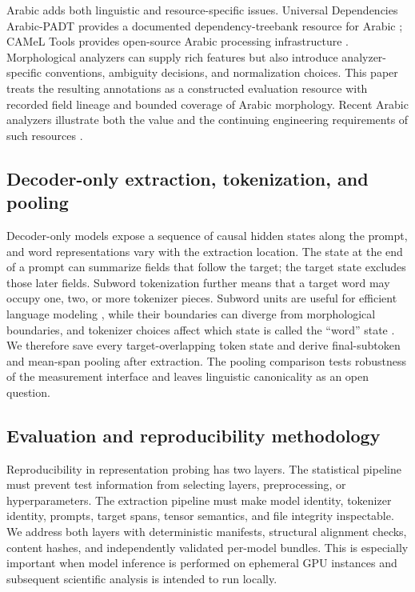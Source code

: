 \documentclass[pdflatex,sn-basic]{sn-jnl}
\begin{document}
Arabic adds both linguistic and resource-specific issues. Universal
Dependencies Arabic-PADT provides a documented dependency-treebank resource
for Arabic \citep{taji-etal-2017}; CAMeL Tools provides open-source Arabic
processing infrastructure \citep{obeid-etal-2020}. Morphological analyzers
can supply rich features but also introduce analyzer-specific conventions,
ambiguity decisions, and normalization choices. This paper treats the
resulting annotations as a constructed evaluation resource with recorded field
lineage and bounded coverage of Arabic morphology. Recent Arabic analyzers
illustrate both the value and the
continuing engineering requirements of such resources
\citep{khairallah-etal-2024}.

\subsection{Decoder-only extraction, tokenization, and pooling}

Decoder-only models expose a sequence of causal hidden states along the
prompt, and word representations vary with the extraction location. The state at
the end of a prompt can summarize fields that follow the target; the target
state excludes those later fields. Subword tokenization further means that a target word may occupy one,
two, or more tokenizer pieces. Subword units are useful for efficient language
modeling \citep{sennrich-etal-2016}, while their boundaries can diverge from
morphological boundaries, and tokenizer choices affect which state is called
the ``word'' state \citep{bostrom-durrett-2020}. We therefore save every
target-overlapping token state and derive final-subtoken and mean-span pooling
after extraction. The pooling comparison tests robustness of the measurement
interface and leaves linguistic canonicality as an open question.

\subsection{Evaluation and reproducibility methodology}

Reproducibility in representation probing has two layers. The statistical
pipeline must prevent test information from selecting layers, preprocessing,
or hyperparameters. The extraction pipeline must make model identity,
tokenizer identity, prompts, target spans, tensor semantics, and file
integrity inspectable. We address both layers with deterministic manifests,
structural alignment checks, content hashes, and independently validated
per-model bundles. This is especially important when model inference is
performed on ephemeral GPU instances and subsequent scientific analysis is
intended to run locally.
\end{document}
